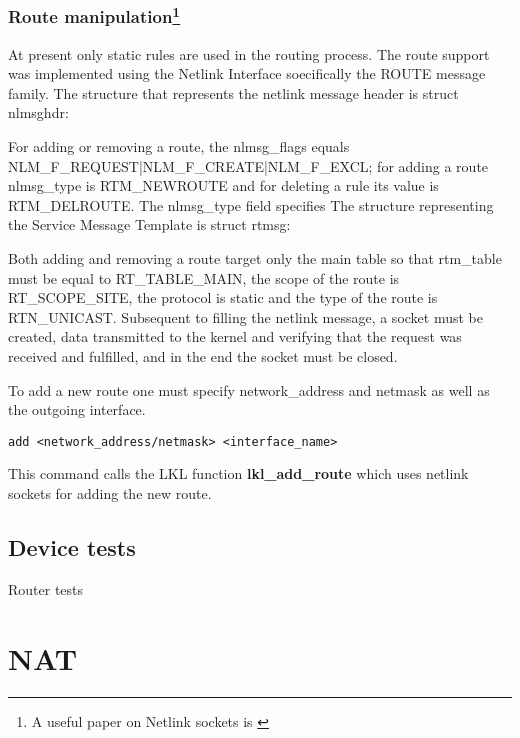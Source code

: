 {{\subsubsection[Route manipulation]{Route manipulation\footnote{A useful paper on Netlink sockets is \cite{netlinksockets}}}
At present only static rules are used in the routing process.
The route support was implemented using the Netlink Interface soecifically the ROUTE message family.
The structure that represents the netlink message header is struct nlmsghdr:
\lstset{language=C, caption=Netlink Message Header Structure}

For adding or removing a route, the nlmsg_flags equals NLM_F_REQUEST|NLM_F_CREATE|NLM_F_EXCL; for adding a route nlmsg_type is RTM_NEWROUTE and for deleting a rule its value is RTM_DELROUTE.
The nlmsg_type field specifies 
The structure representing the Service Message Template is struct rtmsg:
\lstset{language=C, caption=Service Message Template Structure}

Both adding and removing a route target only the main table so that rtm_table must be equal to RT_TABLE_MAIN, the scope of the route is RT_SCOPE_SITE, the protocol is static and the type of the route is RTN_UNICAST.
Subsequent to filling the netlink message, a socket must be created, data transmitted to the kernel and verifying that the request was received and fulfilled, and in the end the socket must be closed.
\lstset{language=C, caption=Communicating with the kernel}
  

To add a new route one must specify network_address and netmask as well as the outgoing interface.
\lstset{language=zsh,caption=Adding a new interface,label=lst:saddrule}
\begin{lstlisting}
add <network_address/netmask> <interface_name> 
\end{lstlisting}  
This command calls the LKL function {\bf lkl_add_route} which uses netlink sockets for adding the new route.

\subsection{Device tests}
\label{sub-sec:router-tests}

Router tests

\section{NAT}
\label{sub-sec:nat-impl}

}}
